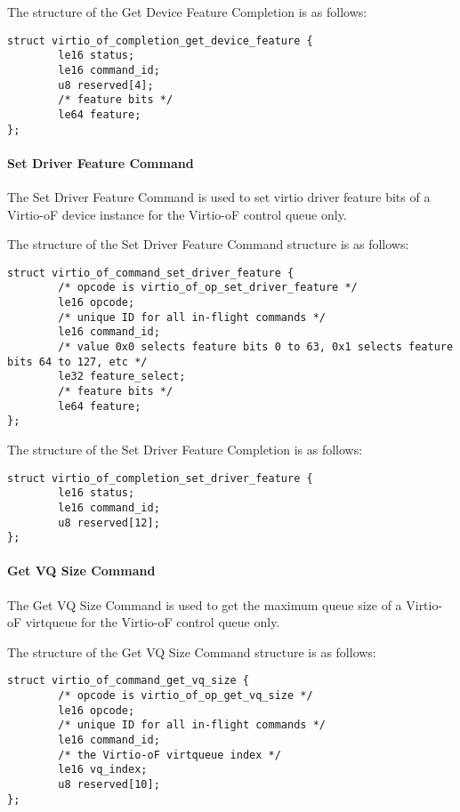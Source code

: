 The structure of the Get Device Feature Completion is as follows:
\begin{lstlisting}
struct virtio_of_completion_get_device_feature {
        le16 status;
        le16 command_id;
        u8 reserved[4];
        /* feature bits */
        le64 feature;
};
\end{lstlisting}

\paragraph{Set Driver Feature Command}\label{sec:Virtio Transport Options / Virtio Over Fabrics / Commands Definition / Opcodes / Set Driver Feature Command}
The Set Driver Feature Command is used to set virtio driver feature bits of a Virtio-oF device instance for the Virtio-oF control queue only.

The structure of the Set Driver Feature Command structure is as follows:
\begin{lstlisting}
struct virtio_of_command_set_driver_feature {
        /* opcode is virtio_of_op_set_driver_feature */
        le16 opcode;
        /* unique ID for all in-flight commands */
        le16 command_id;
        /* value 0x0 selects feature bits 0 to 63, 0x1 selects feature bits 64 to 127, etc */
        le32 feature_select;
        /* feature bits */
        le64 feature;
};
\end{lstlisting}

The structure of the Set Driver Feature Completion is as follows:
\begin{lstlisting}
struct virtio_of_completion_set_driver_feature {
        le16 status;
        le16 command_id;
        u8 reserved[12];
};
\end{lstlisting}

\paragraph{Get VQ Size Command}\label{sec:Virtio Transport Options / Virtio Over Fabrics / Commands Definition / Opcodes / Get VQ Size Command}
The Get VQ Size Command is used to get the maximum queue size of a Virtio-oF virtqueue for the Virtio-oF control queue only.

The structure of the Get VQ Size Command structure is as follows:
\begin{lstlisting}
struct virtio_of_command_get_vq_size {
        /* opcode is virtio_of_op_get_vq_size */
        le16 opcode;
        /* unique ID for all in-flight commands */
        le16 command_id;
        /* the Virtio-oF virtqueue index */
        le16 vq_index;
        u8 reserved[10];
};
\end{lstlisting}


